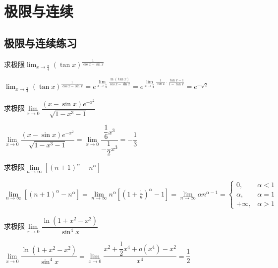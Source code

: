 \documentclass[12pt, a4paper, oneside, UTF8]{ctexbook}
\begin{document}
%
\else
\fi

\chapter{极限与连续}
\section{极限与连续练习}
\begin{exercise}
求极限$\displaystyle\lim_{x \to \frac{\pi}{4}} (\tan x)^{\frac{1}{\cos x-\sin x}}$
\end{exercise}
\begin{solution}
        $\displaystyle\lim_{x \to \frac{\pi}{4}} (\tan x)^{\frac{1}{\cos x-\sin x}} 
        = e^{\lim\limits_{x \to \frac{\pi}{4}} \frac{\ln(\tan x)}{\cos x - \sin x}}
        = e^{\lim\limits_{x \to \frac{\pi}{4}}\frac{1}{\cos x}\cdot \frac{\tan x - 1}{1 - \tan x}} 
        = \boxed{e^{-\sqrt{2}}}$
\end{solution}
\begin{exercise}
    求极限$\lim\limits_{x \to 0}\dfrac{(x-\sin x)e^{-x^{2}}}{\sqrt{1-x^{3}-1}}$
\end{exercise}
\begin{solution}
    $\lim\limits_{x \to 0}\dfrac{(x-\sin x)e^{-x^{2}}}{\sqrt{1-x^{3}-1}}
    = \lim\limits_{x \to 0}\dfrac{\dfrac{1}{6}x^{3}}{-\dfrac{1}{2}x^{3}}
    = \boxed{-\dfrac{1}{3}}$
\end{solution}
\begin{exercise}
    求极限$\lim\limits_{n \to \infty}[(n+1)^{\alpha}-n^{\alpha}]$
\end{exercise}
\begin{solution}
    $\lim\limits_{n \to \infty}[(n+1)^{\alpha}-n^{\alpha}]
    =\lim\limits_{n \to \infty} n^{\alpha}\left[(1+ \frac{1}{n})^{\alpha}-1\right]
    =\lim\limits_{n \to \infty} \alpha n^{\alpha-1}=
    \boxed{\begin{cases}
        0, & \alpha < 1\\
        \alpha, & \alpha = 1\\
        +\infty, & \alpha > 1
    \end{cases}}$
\end{solution}
\begin{exercise}
    求极限$\lim\limits_{x \to 0}\dfrac{\ln(1+x^{2}-x^{2})}{\sin^{4} x}$
\end{exercise}
\begin{solution}
    $\lim\limits_{x \to 0}\dfrac{\ln(1+x^{2}-x^{2})}{\sin^{4} x}
    =\lim\limits_{x \to 0}\dfrac{x^2 + \dfrac{1}{2}x^4 +o(x^4)-x^2}{x^4}
    =\boxed{\dfrac{1}{2}}$
\end{solution}
\end{document}
